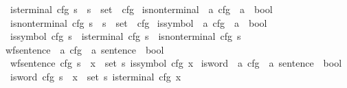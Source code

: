 \begin{isabellebody}
\ \ {\isachardoublequoteopen}is{\isacharunderscore}{\kern0pt}terminal\ cfg\ s\ {\isacharequal}{\kern0pt}\ {\isacharparenleft}{\kern0pt}s\ {\isasymin}\ set\ {\isacharparenleft}{\kern0pt}{\isasymTT}\ cfg{\isacharparenright}{\kern0pt}{\isacharparenright}{\kern0pt}{\isachardoublequoteclose}\isanewline
\isanewline
{}\isamarkupfalse%
\ is{\isacharunderscore}{\kern0pt}nonterminal\ {\isacharcolon}{\kern0pt}{\isacharcolon}{\kern0pt}\ {\isachardoublequoteopen}{\isacharprime}{\kern0pt}a\ cfg\ {\isasymRightarrow}\ {\isacharprime}{\kern0pt}a\ {\isasymRightarrow}\ bool{\isachardoublequoteclose}\ \isanewline
\ \ {\isachardoublequoteopen}is{\isacharunderscore}{\kern0pt}nonterminal\ cfg\ s\ {\isacharequal}{\kern0pt}\ {\isacharparenleft}{\kern0pt}s\ {\isasymin}\ set\ {\isacharparenleft}{\kern0pt}{\isasymNN}\ cfg{\isacharparenright}{\kern0pt}{\isacharparenright}{\kern0pt}{\isachardoublequoteclose}\isanewline
\isanewline
{}\isamarkupfalse%
\ is{\isacharunderscore}{\kern0pt}symbol\ {\isacharcolon}{\kern0pt}{\isacharcolon}{\kern0pt}\ {\isachardoublequoteopen}{\isacharprime}{\kern0pt}a\ cfg\ {\isasymRightarrow}\ {\isacharprime}{\kern0pt}a\ {\isasymRightarrow}\ bool{\isachardoublequoteclose}\ \isanewline
\ \ {\isachardoublequoteopen}is{\isacharunderscore}{\kern0pt}symbol\ cfg\ s\ {\isasymlongleftrightarrow}\ is{\isacharunderscore}{\kern0pt}terminal\ cfg\ s\ {\isasymor}\ is{\isacharunderscore}{\kern0pt}nonterminal\ cfg\ s{\isachardoublequoteclose}\isanewline
\isanewline
{}\isamarkupfalse%
\ wf{\isacharunderscore}{\kern0pt}sentence\ {\isacharcolon}{\kern0pt}{\isacharcolon}{\kern0pt}\ {\isachardoublequoteopen}{\isacharprime}{\kern0pt}a\ cfg\ {\isasymRightarrow}\ {\isacharprime}{\kern0pt}a\ sentence\ {\isasymRightarrow}\ bool{\isachardoublequoteclose}\ \isanewline
\ \ {\isachardoublequoteopen}wf{\isacharunderscore}{\kern0pt}sentence\ cfg\ s\ {\isacharequal}{\kern0pt}\ {\isacharparenleft}{\kern0pt}{\isasymforall}x\ {\isasymin}\ set\ s{\isachardot}{\kern0pt}\ is{\isacharunderscore}{\kern0pt}symbol\ cfg\ x{\isacharparenright}{\kern0pt}{\isachardoublequoteclose}\isanewline
\isanewline
{}\isamarkupfalse%
\ is{\isacharunderscore}{\kern0pt}word\ {\isacharcolon}{\kern0pt}{\isacharcolon}{\kern0pt}\ {\isachardoublequoteopen}{\isacharprime}{\kern0pt}a\ cfg\ {\isasymRightarrow}\ {\isacharprime}{\kern0pt}a\ sentence\ {\isasymRightarrow}\ bool{\isachardoublequoteclose}\ \isanewline
\ \ {\isachardoublequoteopen}is{\isacharunderscore}{\kern0pt}word\ cfg\ s\ {\isacharequal}{\kern0pt}\ {\isacharparenleft}{\kern0pt}{\isasymforall}x\ {\isasymin}\ set\ s{\isachardot}{\kern0pt}\ is{\isacharunderscore}{\kern0pt}terminal\ cfg\ x{\isacharparenright}{\kern0pt}{\isachardoublequoteclose}\isanewline

\end{isabellebody}
